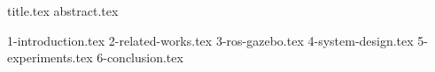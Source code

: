 \documentclass[conference]{IEEEtran}[2015/08/26]
\begin{document}
  {title.tex}
  {abstract.tex}

  {1-introduction.tex}
  {2-related-works.tex}
  {3-ros-gazebo.tex}
  {4-system-design.tex}
  {5-experiments.tex}
  {6-conclusion.tex}

  \balance

  
  
\end{document}
